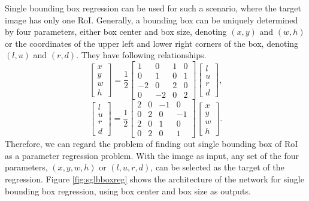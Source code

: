 Single bounding box regression can be used for such a scenario, where the target image has only one RoI. Generally, a bounding box can be uniquely determined by four parameters, either box center and box size, denoting $(x, y)$ and $(w, h)$ or the coordinates of the upper left and lower right corners of the box, denoting $(l, u)$ and $(r, d)$. They have following relationships.
\begin{equation}
	\left[\begin{array}{c}
		x\\y\\w\\h
	\end{array}\right]=\frac{1}{2}\left[\begin{array}{cccc}
		1 & 0 & 1 & 0 \\
		0 & 1 & 0 & 1 \\
		-2 & 0 & 2 & 0 \\
		0 & -2 & 0 & 2
	\end{array}\right]\left[\begin{array}{c}
		l\\u\\r\\d
	\end{array}\right],
\end{equation}
\begin{equation}
	\left[\begin{array}{c}
		l\\u\\r\\d
	\end{array}\right]=\frac{1}{2}\left[\begin{array}{cccc}
		2 & 0 & -1 & 0 \\
		0 & 2 & 0 & -1 \\
		2 & 0 & 1 & 0 \\
		0 & 2 & 0 & 1
	\end{array}\right]\left[\begin{array}{c}
		x\\y\\w\\h
	\end{array}\right].
\end{equation}
Therefore, we can regard the problem of finding out single bounding box of RoI as a parameter regression problem. With the image as input, any set of the four parameters, $(x, y, w, h)$ or $(l, u, r, d)$, can be selected as the target of the regression. Figure \ref{fig:sglbboxreg} shows the architecture of the network for single bounding box regression, using box center and box size as outputs.

